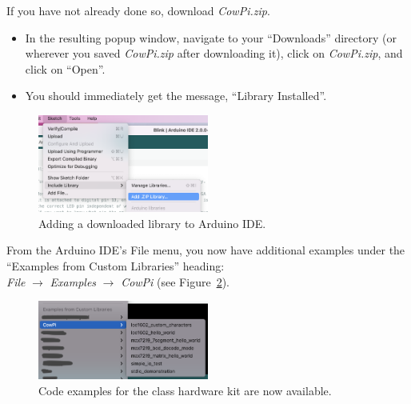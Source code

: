 If you have not already done so, download \textit{CowPi.zip}.

\begin{description}
        \begin{itemize}
            \item In the resulting popup window, navigate to your ``Downloads'' directory (or wherever you saved \textit{CowPi.zip} after downloading it), click on \textit{CowPi.zip}, and click on ``Open''.
            \item You should immediately get the message, ``Library Installed''.
        \end{itemize}
\end{description}

\begin{figure}
    \centering
    \includegraphics[width=0.5\textwidth]{direct/library/add-zip-library}
    \caption{Adding a downloaded library to Arduino IDE. \label{fig:add-library}}
\end{figure}

From the Arduino IDE's File menu, you now have additional examples under the ``Examples from Custom Libraries'' heading: \\
\textit{File} $\rightarrow$ \textit{Examples} $\rightarrow$ \textit{CowPi}
(see Figure~\ref{fig:library-examples}).

\begin{figure}
    \centering
    \includegraphics[width=0.5\textwidth]{direct/library/library-examples}
    \caption{Code examples for the class hardware kit are now available. \label{fig:library-examples}}
\end{figure}

